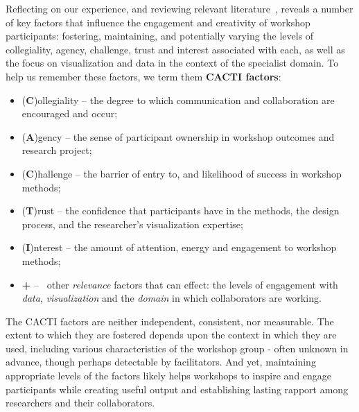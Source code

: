 \begin{tcolorbox}[floatplacement=t,float,title=Fostering Creativity with CACTI Factors]
Reflecting on our experience, and reviewing relevant literature~\cite{Nickerson1999,Osborn1953,Sawyer2003,Sawyer2006,Shneiderman2005}, reveals a number of key factors that influence the engagement and creativity of workshop participants: fostering, maintaining, and potentially varying the levels of collegiality, agency, challenge, trust and interest associated with each, as well as the focus on visualization and data in the context of the specialist domain. To help us remember these factors, we term them {\bf CACTI factors}: 
\begin{itemize}[noitemsep,nolistsep]
\item(\textbf{C})ollegiality -- the degree to which communication and collaboration are encouraged and occur;
\item(\textbf{A})gency -- the sense of participant ownership in workshop outcomes and research project;
\item(\textbf{C})hallenge -- the barrier of entry to, and likelihood of success in workshop methods; 
\item(\textbf{T})rust --  the confidence that participants have in the methods, the design process, and the researcher's visualization expertise; 
\item(\textbf{I})nterest -- the amount of attention, energy and engagement to workshop methods;
\item\textbf{+} -- ~other \emph{relevance} factors that can effect: the levels of engagement with \emph{data}, \emph{visualization} and the \emph{domain} in which collaborators are working.
\end{itemize}
The CACTI factors are neither independent, consistent, nor measurable. The extent to which they are fostered depends upon the context in which they are used, including various characteristics of the workshop group - often unknown in advance, though perhaps detectable by facilitators. And yet, maintaining appropriate levels of the factors likely helps workshops to inspire and engage participants while creating useful output and establishing lasting rapport among researchers and their collaborators.
\end{tcolorbox}